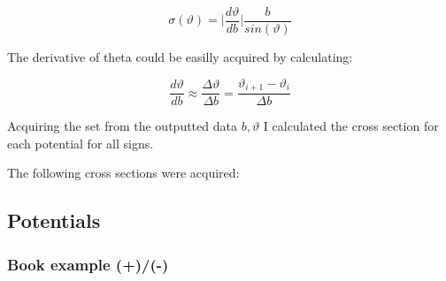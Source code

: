 \documentclass[a4paper,12pt]{article}
\begin{document}
\begin{equation}
	\sigma(\vartheta) = \Big|\frac{d\vartheta}{db}\Big|\frac{b}{sin(\vartheta)}
\end{equation}

\par The derivative of theta could be easilly acquired by calculating:

\begin{equation}
	\frac{d\vartheta}{db} \approx \frac{\Delta \vartheta}{\Delta b} = \frac{\vartheta_{i+1} - \vartheta_{i}}{\Delta b}
\end{equation}

\par Acquiring the set from the outputted data $b, \vartheta$ I calculated the cross section
for each potential for all signs.

\par The following cross sections were acquired:

\subsection{Potentials}

\subsubsection{Book example (+)/(-)}
\end{document}
